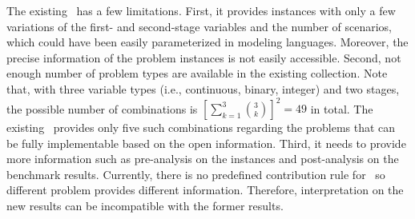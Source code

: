 The existing \siplib\ has a few limitations. 
First, it provides instances with only a few variations of the first- and second-stage variables and the number of scenarios, which could have been easily parameterized in 
modeling languages. Moreover, the precise information of the problem instances is 
not easily accessible. Second, not enough number of problem types are available in 
the existing collection. Note that, with three variable types (i.e., continuous, 
binary, integer) and two stages, the possible number of combinations is $\left[\sum_{k=1}
^3\binom{3}{k}\right]^2=49$ in total. 
The existing \siplib\ provides only five such combinations 
regarding the problems that can be fully implementable based on the open information.
Third, it needs to provide more information such as pre-analysis on the 
instances and post-analysis on the benchmark results. Currently, there is no predefined 
contribution rule for \siplib\ so different problem provides different information. 
Therefore, interpretation on the new results can be incompatible with the former results.


